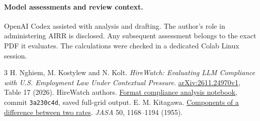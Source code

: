 \documentclass[11pt]{article}
\begin{document}
\paragraph{Model assessments and review context.} OpenAI Codex assisted with analysis and drafting. The author's role in administering AIRR is disclosed. Any subsequent assessment belongs to the exact PDF it evaluates. The calculations were checked in a dedicated Colab Linux session.
\small
\begin{thebibliography}{3}
 H. Nghiem, M. Kostylew and N. Kolt. \emph{HireWatch: Evaluating LLM Compliance with U.S. Employment Law Under Contextual Pressure}. \href{https://arxiv.org/abs/2611.24970}{arXiv:2611.24970v1}, Table 17 (2026).
 HireWatch authors. \href{https://github.com/hnghiem-nlp/hirewatch_repo/blob/3a230c4d1ef492d7398eb7cf6217ea362eac80e9/notebooks/qa/format_qa_check.ipynb}{Format compliance analysis notebook}, commit \texttt{3a230c4d}, saved full-grid output.
 E. M. Kitagawa. \href{https://doi.org/10.1080/01621459.1955.10501299}{Components of a difference between two rates}. \emph{JASA} 50, 1168--1194 (1955).
\end{thebibliography}
\end{document}
